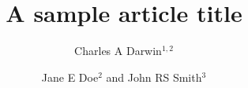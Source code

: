 \documentclass[10pt]{bmc_article}
\newenvironment{bmcformat}{\begin{raggedright}\baselineskip20pt\sloppy\setboolean{publ}{false}}{\end{raggedright}\baselineskip20pt\sloppy}
\begin{document}
\begin{bmcformat}



% 
% 
%



\title{A sample article title}
 


\author{Charles A Darwin\correspondingauthor$^{1,2}$%
      \and
         Jane E Doe\correspondingauthor$^2$%
       and 
         John RS Smith$^3$%
      }
      


\address{%
    \iid(1)Life Sciences Department, Kings College London, Cornwall House,%
        Waterloo Road, London, UK\\
    \iid(2)Department of Zoology, Cambridge, Waterloo Road, London, UK\\
    \iid(3)Marine Ecology Department, Institute of Marine Sciences Kiel, %
        D\"{u}sternbrooker Weg 20, 24105 Kiel, Germany
}%


\end{bmcformat}
\end{document}
